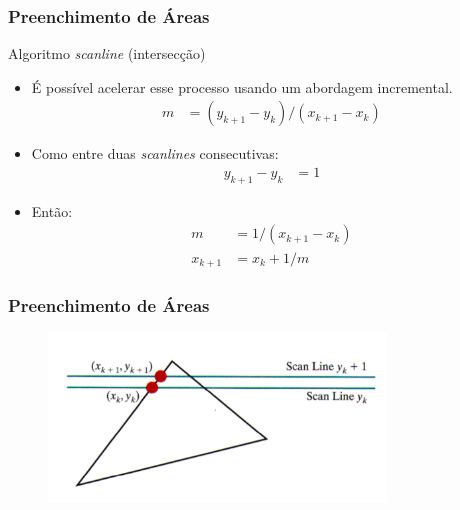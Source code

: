 \documentclass{beamer}
\begin{document}
\begin{frame}
\frametitle{Preenchimento de Áreas}

	\begin{block}{Algoritmo \textit{scanline} (intersecção)}
		\begin{itemize}
			\item É possível acelerar esse processo usando um abordagem incremental.
				\begin{align*}
					m &= (y_{k+1} - y_k)/(x_{k+1} - x_k)
				\end{align*}
			\item Como entre duas \textit{scanlines} consecutivas:
				\begin{align*}
					y_{k+1} - y_k &= 1
				\end{align*}
			\item Então:
				\begin{align*}
					m &= 1/(x_{k+1} - x_k)\\
					x_{k+1} &= x_k + 1/m
				\end{align*}
		\end{itemize}
	\end{block}
	
\end{frame}


\begin{frame}
\frametitle{Preenchimento de Áreas}

	\begin{figure}[!h]
			\begin{center}
				\includegraphics[width=0.8\textwidth]{Figures/Sca}
			\end{center}
		\end{figure}
	
\end{frame}
\end{document}
